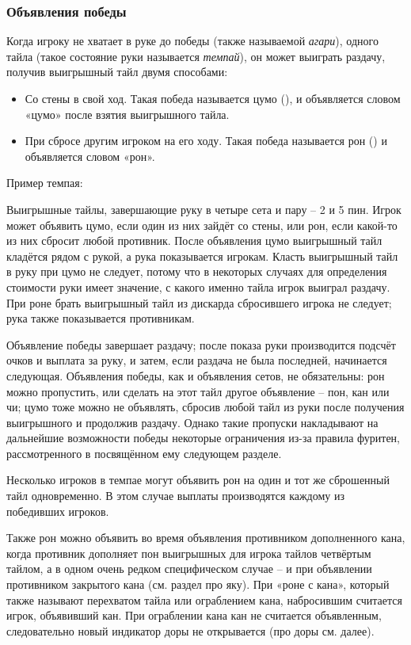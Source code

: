 \subsubsection{Объявления победы}

Когда игроку не хватает в руке до победы (также называемой \textit{агари}), одного тайла (такое состояние руки называется \textit{темпай}), он может выиграть раздачу, получив выигрышный тайл двумя способами:

\begin{itemize}
	\item Со стены в свой ход. Такая победа называется цумо (), и объявляется словом «цумо» после взятия выигрышного тайла.
	\item При сбросе другим игроком на его ходу. Такая победа называется рон () и объявляется словом «рон».
\end{itemize}

Пример темпая:

 \hfill {}

Выигрышные тайлы, завершающие руку в четыре сета и пару – 2 и 5 пин. Игрок может объявить цумо, если один из них зайдёт со стены, или рон, если какой-то из них сбросит любой противник. После объявления цумо выигрышный тайл кладётся рядом с рукой, а рука показывается игрокам. Класть выигрышный тайл в руку при цумо не следует, потому что в некоторых случаях для определения стоимости руки имеет значение, с какого именно тайла игрок выиграл раздачу. При роне брать выигрышный тайл из дискарда сбросившего игрока не следует; рука также показывается противникам.

Объявление победы завершает раздачу; после показа руки производится подсчёт очков и выплата за руку, и затем, если раздача не была последней, начинается следующая. Объявления победы, как и объявления сетов, не обязательны: рон можно пропустить, или сделать на этот тайл другое объявление – пон, кан или чи; цумо тоже можно не объявлять, сбросив любой тайл из руки после получения выигрышного и продолжив раздачу. Однако такие пропуски накладывают на дальнейшие возможности победы некоторые ограничения из-за правила фуритен, рассмотренного в посвящённом ему следующем разделе.

Несколько игроков в темпае могут объявить рон на один и тот же сброшенный тайл одновременно. В этом случае выплаты производятся каждому из победивших игроков. 

Также рон можно объявить во время объявления противником дополненного кана, когда противник дополняет пон выигрышных для игрока тайлов четвёртым тайлом, а в одном очень редком специфическом случае – и при объявлении противником закрытого кана (см. раздел про яку). При «роне с кана», который также называют перехватом тайла или ограблением кана, набросившим считается игрок, объявивший кан. При ограблении кана кан не считается объявленным, следовательно новый индикатор доры не открывается (про доры см. далее).

